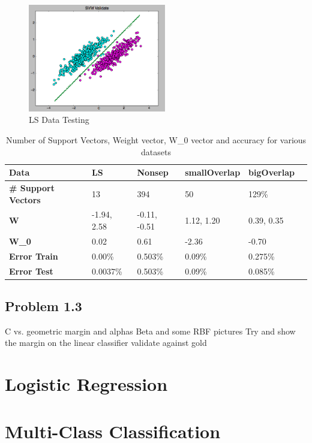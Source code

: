 \documentclass[pageno]{jpaper}
\begin{document}
\begin{figure}[ht!]
\centering
\includegraphics[width=60mm]{ls_test}
\caption{LS Data Testing}
\label{overflow}
\end{figure}



\begin{table}[h!]
  \centering
  \begin{tabular}{llllll|}
    \hline
     \textbf{Data} &\textbf{LS}  & \textbf{Nonsep}  & \textbf{smallOverlap} & \textbf{bigOverlap}\\
    \hline
    \hline
 \textbf{\# Support Vectors} 	&13 &394 &50   &129\%\\
 \hline
\textbf{W}	&-1.94, 2.58 	&  -0.11, -0.51 & 1.12, 1.20 & 0.39, 0.35 \\
 \hline
\textbf{W\_0}	&0.02	&0.61 &-2.36 &-0.70 \\
 \hline
\textbf{Error Train}	&0.00\% 	&0.503\% &0.09\% &0.275\%\\
 \hline
 \textbf{Error Test}	&0.0037\% 	&0.503\% &0.09\% &0.085\%\\
 \hline

  \end{tabular}
  \caption{Number of Support Vectors, Weight vector, W\_0 vector and accuracy for various datasets}
  \label{table:formatting}
\end{table}


\subsection{Problem 1.3}
C vs. geometric margin and alphas 
Beta and some RBF pictures
Try and show the margin on the linear classifier
validate against gold
\section{Logistic Regression}
\section{Multi-Class Classification}
\end{document}
